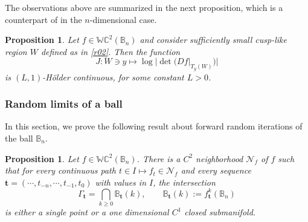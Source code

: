 \documentclass[11pt,reqno]{amsart}
\theoremstyle{plain}
\newtheorem{proposition}[theorem]{Proposition}
\newtheorem*{theorem A}{Theorem A}
\newtheorem*{theorem B}{Theorem B}
\newtheorem*{theorem C}{Theorem C}
\newtheorem*{theorem 1}{Theorem 1}
\newtheorem*{theorem 2}{Theorem 2}
\newtheorem*{theorem 3}{Theorem 3}
\numberwithin{equation}{section}
\begin{document}
The observations above are summarized in the next proposition, which is a counterpart of \cite[Thm.~2.7]{zaj2018physical} in the $n$-dimensional case.

\begin{proposition}\label{thmcusp}
Let $f\in\mathbb{WC}^2 ( \mathbb{B}_n)$ and consider sufficiently small cusp-like region $W$ defined as in \eqref{r02}.
Then the function
\begin{equation*}
J : W \ni y \mapsto \log |\det(Df|_{T_y(W)})|
\end{equation*}
is $(L,1)$-H\"{o}lder continuous, for some constant $L > 0$.
\end{proposition}

\subsubsection{Random limits of a ball }\label{sss.randomlimits}

In this section, we prove the following result about forward random iterations of the ball $\mathbb{B}_n$.

\begin{proposition}\label{open}
Let $f\in\mathbb{WC}^2 ( \mathbb{B}_n)$.
There is a $C^2$ neighborhood $\mathcal{N}_f$ of $f$ such that for every continuous path $t \in I \mapsto f_t \in \mathcal{N}_f$ and every sequence $\mathbf{t}=(\cdots, t_{-n}, \cdots, t_{-1}, t_0)$ with values in $I$, the intersection
\begin{equation*}
\Gamma_{\mathbf{t}}= \bigcap_{k\ge 0} \mathbb{B}_{\mathbf{t}} (k),
\qquad
\mathbb{B}_{\mathbf{t}} (k) := f^k_{\mathbf{t}} (\mathbb{B}_{n})
\end{equation*}
is either a single point or a one dimensional $C^1$ closed submanifold.
\end{proposition}
\end{document}
